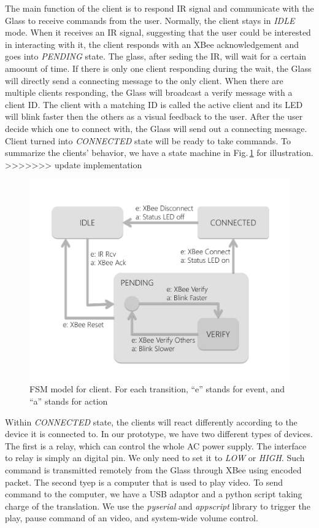 The main function of the client is to respond IR signal and communicate with the Glass to receive commands from the user. Normally, the client stays in {\it IDLE} mode. When it receives an IR signal, suggesting that the user could be interested in interacting with it, the client responds with an XBee acknowledgement and goes into {\it PENDING} state. The glass, after seding the IR, will wait for a certain amoount of time. If there is only one client responding during the wait, the Glass will directly send a connecting message to the only client. When there are multiple clients responding, the Glass will broadcast a verify message with a client ID. The client with a matching ID is called the active client and its LED will blink faster then the others as a visual feedback to the user. After the user decide which one to connect with, the Glass will send out a connecting message. Client turned into {\it CONNECTED} state will be ready to take commands. To summarize the clients' behavior, we have a state machine in Fig.\,\ref{fig:clientFSM} for illustration.
>>>>>>> update implementation

\begin{figure}
  \centering
  \includegraphics[width=\linewidth]{../figs/clientFSM.pdf}
  \caption{FSM model for client. For each transition, ``e'' stands for event, and ``a'' stands for action}
  \label{fig:clientFSM}
\end{figure}

Within {\it CONNECTED} state, the clients will react differently according to the device it is connected to. In our prototype, we have two different types of devices. The first is a relay, which can control the whole AC power supply. The interface to relay is simply an digital pin. We only need to set it to {\it LOW} or {\it HIGH}. Such command is transmitted remotely from the Glass through XBee using encoded packet. The second tyep is a computer that is used to play video. To send command to the computer, we have a USB adaptor and a python script taking charge of the translation. We use the {\it pyserial} and {\it appscript} library to trigger the play, pause command of an video, and system-wide volume control.

